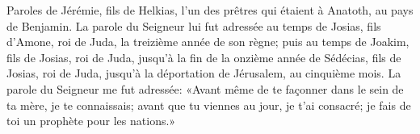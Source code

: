 Paroles de Jérémie, fils de Helkias,
	l’un des prêtres qui étaient à Anatoth, au pays de Benjamin.
La parole du Seigneur lui fut adressée au temps de Josias,
		fils d’Amone, roi de Juda, la treizième année de son règne;
	puis au temps de Joakim, fils de Josias, roi de Juda,
	jusqu’à la fin de la onzième année de Sédécias, fils de Josias, roi de Juda,
	jusqu’à la déportation de Jérusalem, au cinquième mois.
La parole du Seigneur me fut adressée:
	«Avant même de te façonner dans le sein de ta mère, je te connaissais;
	avant que tu viennes au jour, je t’ai consacré;
	je fais de toi un prophète pour les nations.»
